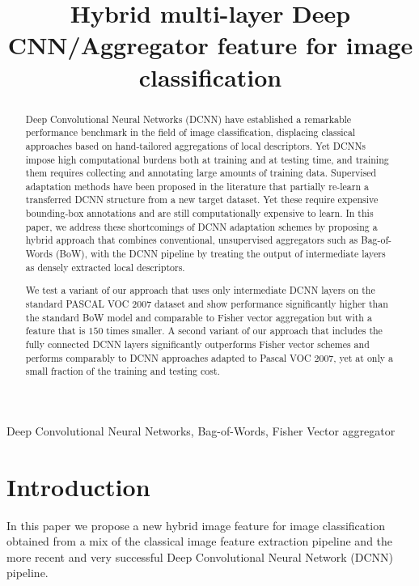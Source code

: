 \documentclass{article}
\title{Hybrid multi-layer Deep CNN/Aggregator feature for image classification}
\begin{document}


%
\maketitle
% 
\begin{abstract}
Deep Convolutional Neural Networks (DCNN) have established a remarkable performance benchmark in the field of image classification, displacing classical approaches based on hand-tailored aggregations of local descriptors. Yet DCNNs impose high computational burdens both at training and at testing time, and training them requires collecting and annotating large amounts of training data. Supervised adaptation methods have been proposed in the literature that partially re-learn a transferred DCNN structure from a new target dataset. Yet these require expensive bounding-box annotations and are still computationally expensive to learn.  In this paper, we address these shortcomings of DCNN adaptation schemes by proposing a hybrid approach that combines conventional, unsupervised aggregators such as Bag-of-Words (BoW), with the DCNN pipeline by treating the output of intermediate layers as densely extracted local descriptors.

We test a variant of our approach that uses only intermediate DCNN layers on the standard PASCAL VOC 2007 dataset and show performance significantly higher than the standard BoW model and comparable to Fisher vector aggregation but with a feature that is $150$ times smaller. A second variant of our approach that includes the fully connected DCNN layers significantly outperforms Fisher vector schemes and performs comparably to DCNN approaches adapted to Pascal VOC 2007, yet at only a small fraction of the training and testing cost.
\end{abstract}

%
\begin{keywords}
Deep Convolutional Neural Networks, Bag-of-Words, Fisher Vector aggregator
\end{keywords}
%



\section{Introduction}
In this paper we propose a new hybrid image feature for image classification obtained from a mix of the classical image feature extraction pipeline and the more recent and very successful Deep Convolutional Neural Network (DCNN) pipeline. 
\end{document}
